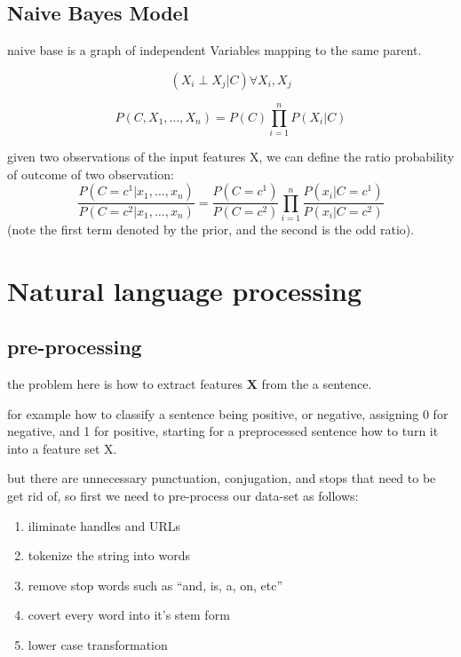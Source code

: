 \documentclass[4apaper,12pt]{book}
\begin{document}
  \section{Naive Bayes Model}
  \begin{description}
  \item naive base is a graph of independent Variables mapping to the  same parent.
  \item {}

  \item $$(X_i \perp X_j | C) \forall X_i,X_j$$
  \item $$P(C,X_1,\dots,X_n) = P(C) \prod_{i=1}^{n}P(X_i|C) $$
  \item given two observations of the input features X, we can define the ratio probability of outcome of two observation: $$
    \frac{P(C=c^1 | x_1,\dots,x_n)}{P(C=c^2 | x_1,\dots,x_n)} = \frac{P(C=c^1)}{P(C=c^2)}\prod_{i=1}^n\frac{P(x_i|C=c^1)}{P(x_i|C=c^2)}$$ (note the first term denoted by the prior, and the second is the odd ratio).

  \end{description}

  \chapter{Natural language processing}
  \section{pre-processing}
  \begin{description}
  \item the problem here is how to extract features $\mathbf{X}$ from the a sentence.
  \item for example how to classify a sentence being positive, or negative, assigning 0 for negative, and 1 for positive, starting for a preprocessed sentence how to turn it into a feature set X.
  \item but there are unnecessary punctuation, conjugation, and stops that need to be get rid of, so first we need to pre-process our data-set as follows:
    \begin{enumerate}
    \item iliminate handles and URLs
    \item tokenize the string into words
    \item remove stop words such as ``and, is, a, on, etc''
    \item covert every word into it's stem form
    \item lower case transformation
    \end{enumerate}

  \end{description}
\end{document}
